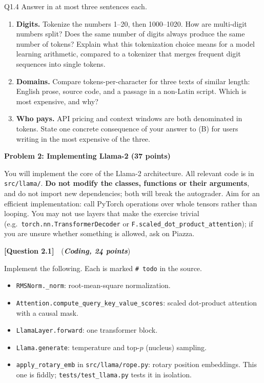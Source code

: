\documentclass[11pt]{article}
\newcommand{\problem}[1]{%
  \vspace{1em}
  \noindent\colorbox{headerblue}{\parbox{\dimexpr\textwidth-2\fboxsep}{%
    \vspace{2pt}\textbf{\large #1}\vspace{2pt}}}
  \vspace{0.6em}
}
\newcommand{\question}[3]{%
  \vspace{0.9em}
  \noindent\textbf{[Question #1]}\ \ (\textit{\textbf{#2, #3 points}})\quad
}
\begin{document}
\begin{deliverables}{Q1.4}
Answer in at most three sentences each.
\begin{enumerate}[label=\Alph*., leftmargin=1.6em]
  \item \textbf{Digits.} Tokenize the numbers 1--20, then 1000--1020. How are multi-digit numbers
    split? Does the same number of digits always produce the same number of tokens? Explain what
    this tokenization choice means for a model learning arithmetic, compared to a tokenizer that
    merges frequent digit sequences into single tokens.
  \item \textbf{Domains.} Compare tokens-per-character for three texts of similar length: English
    prose, source code, and a passage in a non-Latin script. Which is most expensive, and why?
  \item \textbf{Who pays.} API pricing and context windows are both denominated in tokens. State
    one concrete consequence of your answer to (B) for users writing in the most expensive of the
    three.
\end{enumerate}
\end{deliverables}

\problem{Problem 2: Implementing Llama-2 (37 points)}

\noindent You will implement the core of the Llama-2 architecture. All relevant code is in
\texttt{src/llama/}. \textbf{Do not modify the classes, functions or their
arguments}, and do not import new dependencies; both will break the autograder. Aim for an
efficient implementation: call PyTorch operations over whole tensors rather than looping. You may
not use layers that make the exercise trivial (e.g.\
\texttt{torch.nn.TransformerDecoder} or \texttt{F.scaled\_dot\_product\_attention}); if you are
unsure whether something is allowed, ask on Piazza.

\question{2.1}{Coding}{24}
Implement the following. Each is marked \texttt{\# todo} in the source.

\begin{itemize}[nosep, leftmargin=2em]
  \item \texttt{RMSNorm.\_norm}: root-mean-square normalization.
  \item \texttt{Attention.compute\_query\_key\_value\_scores}: scaled dot-product attention with
    a causal mask.
  \item \texttt{LlamaLayer.forward}: one transformer block.
  \item \texttt{Llama.generate}: temperature and top-$p$ (nucleus) sampling.
  \item \texttt{apply\_rotary\_emb} in \texttt{src/llama/rope.py}: rotary position embeddings.
    This one is fiddly; \texttt{tests/test\_llama.py} tests it in isolation.
\end{itemize}
\end{document}
